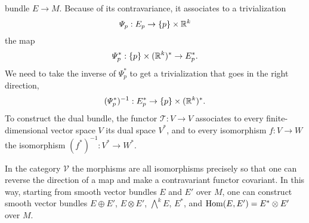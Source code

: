 bundle $E\to M$. Because of its contravariance, it associates to a trivialization
\[\varPsi_p:E_p\to\{p\}\times\mathbb{R}^k\]
the map
\[\varPsi^*_p:\{p\}\times(\mathbb{R}^k)^*\to E_p^*.\]
We need to take the inverse of $\varPsi_p^*$ to get a trivialization that goes in the right direction,
\[(\varPsi^*_p)^{-1}:E_p^*\to\{p\}\times(\mathbb{R}^k)^*.\]
To construct the dual bundle, the functor $\mathscr{T}:V\to V$ associates to every finite-dimensional vector space $V$ its dual space $V^*$, and to every isomorphism 
$f:V\to W$ the isomorphism $(f^*)^{-1}:V^*\to W^*$.\par
In the category $\mathcal{V}$ the morphisms are all isomorphisms precisely so that one can reverse the direction of a map and make a contravariant functor covariant. 
In this way, starting from smooth vector bundles $E$ and $E'$ over $M$, one can construct smooth vector bundles $E\oplus E'$, $E\otimes E'$, $\bigwedge^kE$, $E^*$, and 
$\mathrm{Hom}(E,E')=E^*\otimes E'$ over $M$.
